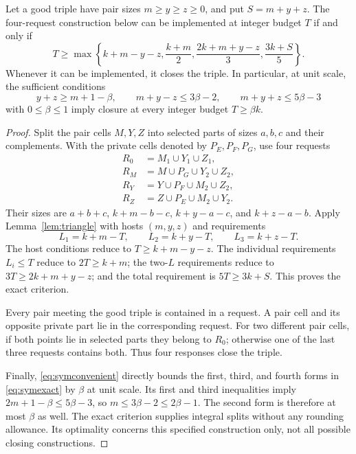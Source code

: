 \begin{lemma}\label{lem:symmetric}
Let a good triple have pair sizes $m\ge y\ge z\ge0$, and put $S=m+y+z$.
The four-request construction below can be implemented at integer
budget $T$ if and only if
\begin{equation}\label{eq:symexact}
 T\ge\max\left\{k+m-y-z,\frac{k+m}{2},
             \frac{2k+m+y-z}{3},\frac{3k+S}{5}\right\}.
\end{equation}
Whenever it can be implemented, it closes the triple.
In particular, at unit scale, the sufficient conditions
\begin{equation}\label{eq:symconvenient}
 y+z\ge m+1-\beta,\qquad m+y-z\le3\beta-2,\qquad
 m+y+z\le5\beta-3
\end{equation}
with $0\le\beta\le1$ imply closure at every integer budget
$T\ge\beta k$.
\end{lemma}
\begin{proof}
Split the pair cells $M,Y,Z$ into selected parts of sizes $a,b,c$ and
their complements. With the private cells denoted by $P_E,P_F,P_G$,
use four requests
\begin{align*}
 R_0&=M_1\cup Y_1\cup Z_1,\\
 R_M&=M\cup P_G\cup Y_2\cup Z_2,\\
 R_Y&=Y\cup P_F\cup M_2\cup Z_2,\\
 R_Z&=Z\cup P_E\cup M_2\cup Y_2.
\end{align*}
Their sizes are $a+b+c$, $k+m-b-c$, $k+y-a-c$, and $k+z-a-b$.
Apply Lemma~\ref{lem:triangle} with hosts $(m,y,z)$ and requirements
\[
 L_1=k+m-T,\qquad L_2=k+y-T,\qquad L_3=k+z-T.
\]
The host conditions reduce to $T\ge k+m-y-z$. The individual
requirements $L_i\le T$ reduce to $2T\ge k+m$; the two-$L$ requirements
reduce to $3T\ge2k+m+y-z$; and the total requirement is
$5T\ge3k+S$. This proves the exact criterion.

Every pair meeting the good triple is contained in a request. A pair
cell and its opposite private part lie in the corresponding request.
For two different pair cells, if both points lie in selected parts they
belong to $R_0$; otherwise one of the last three requests contains both.
Thus four responses close the triple.

Finally, \eqref{eq:symconvenient} directly bounds the first, third, and
fourth forms in \eqref{eq:symexact} by $\beta$ at unit scale. Its first
and third inequalities imply $2m+1-\beta\le5\beta-3$, so
$m\le3\beta-2\le2\beta-1$. The second form is therefore at most
$\beta$ as well. The exact criterion supplies integral splits without
any rounding allowance. Its optimality concerns this specified
construction only, not all possible closing constructions.
\end{proof}

